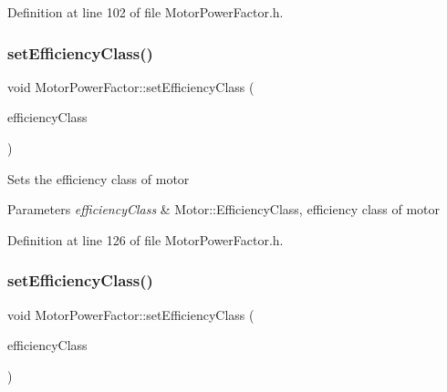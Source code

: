 Definition at line 102 of file Motor\+Power\+Factor.\+h.

\mbox{\label{class_motor_power_factor_add3125243d7f11131abc4e1d172ffdfc}} 
\subsubsection{\texorpdfstring{set\+Efficiency\+Class()}{setEfficiencyClass()}\hspace{0.1cm}{\footnotesize\ttfamily [1/3]}}
{\footnotesize\ttfamily void Motor\+Power\+Factor\+::set\+Efficiency\+Class (\begin{DoxyParamCaption}\item[{Motor\+::\+Efficiency\+Class}]{efficiency\+Class }\end{DoxyParamCaption})\hspace{0.3cm}{\ttfamily [inline]}}

Sets the efficiency class of motor 
\begin{DoxyParams}{Parameters}
{\em efficiency\+Class} & Motor\+::\+Efficiency\+Class, efficiency class of motor \\
\hline
\end{DoxyParams}


Definition at line 126 of file Motor\+Power\+Factor.\+h.

\mbox{\label{class_motor_power_factor_add3125243d7f11131abc4e1d172ffdfc}} 
\subsubsection{\texorpdfstring{set\+Efficiency\+Class()}{setEfficiencyClass()}\hspace{0.1cm}{\footnotesize\ttfamily [2/3]}}
{\footnotesize\ttfamily void Motor\+Power\+Factor\+::set\+Efficiency\+Class (\begin{DoxyParamCaption}\item[{Motor\+::\+Efficiency\+Class}]{efficiency\+Class }\end{DoxyParamCaption})\hspace{0.3cm}{\ttfamily [inline]}}


